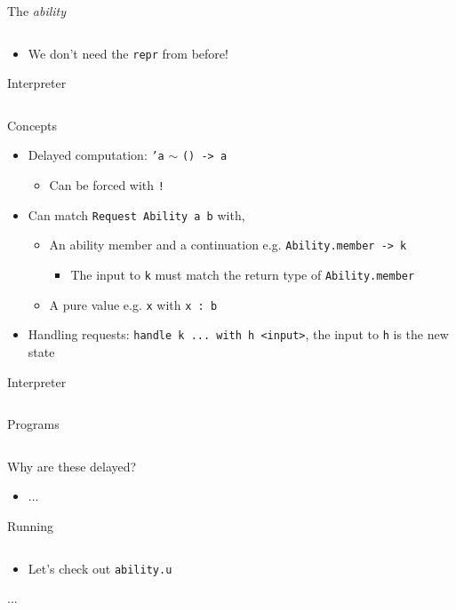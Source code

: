 \documentclass[hyperref={pdfpagelabels=false},12pt]{beamer}
\newcommand{\code}[2]{\texttt{#2}}
\newcommand{\haskell}[1]{\code{haskell}{#1}}
\newcommand{\txt}[1]{\code{text}{#1}}
\newcommand{\bash}[1]{\code{bash}{#1}}
\newcommand{\pygmentLines}[5]{\inputminted[bgcolor=lightgray,linenos,fontsize=#1,firstline=#2,lastline=#3,autogobble]{#4}{#5}}
\begin{document}
\begin{frame}{The \textit{ability}}
  \pygmentLines{\scriptsize}{41}{44}{haskell}{code/ability.u}
  \begin{itemize}
    \item We don't need the \haskell{repr} from before!
  \end{itemize}
\end{frame}

\begin{frame}{Interpreter}
  \pygmentLines{\footnotesize}{11}{21}{text}{code/ability.u}
\end{frame}

\begin{frame}{Concepts}
  \begin{itemize}
    \item Delayed computation: \txt{'a} $\sim$ \txt{() -> a}
    \begin{itemize}
      \item Can be forced with \txt{!}
    \end{itemize}
    \item Can match \txt{Request {Ability a} b} with,
      \begin{itemize}
        \item An ability member and a continuation e.g. \txt{{Ability.member -> k}}
        \begin{itemize}
          \item The input to \txt{k} must match the return type of
            \txt{Ability.member}
        \end{itemize}
        \item A pure value e.g. \txt{{x}} with \txt{x : b}
      \end{itemize}
    \item Handling requests: \txt{handle k ... with h <input>}, the input to
      \txt{h} is the new state
  \end{itemize}
\end{frame}

\begin{frame}{Interpreter}
  \pygmentLines{\footnotesize}{11}{21}{text}{code/ability.u}
\end{frame}

\begin{frame}{Programs}
  \pygmentLines{\footnotesize}{23}{40}{text}{code/ability.u}
\end{frame}

\begin{frame}{Why are these delayed?}
  \begin{itemize}
    \item ...
  \end{itemize}
\end{frame}

\begin{frame}{Running}
  \pygmentLines{\footnotesize}{2}{4}{text}{code/ability.u}
  \begin{itemize}
    \item Let's check out \bash{ability.u}
  \end{itemize}
\end{frame}

\begin{frame}{...}
\end{frame}
\end{document}
